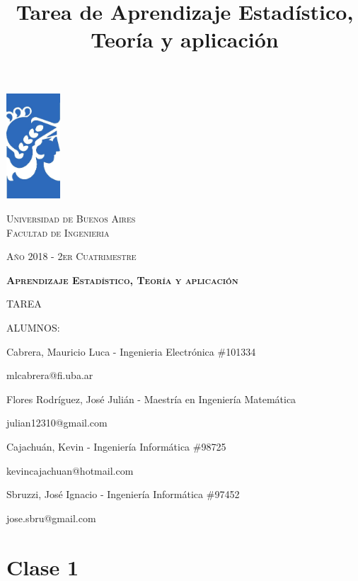 \documentclass[12pt, a4paper]{article}
\title{Tarea de Aprendizaje Estadístico, Teoría y aplicación}
\author{}
\date{}
\begin{document}
\begin{titlepage} %
	\centering
	  \includegraphics[width=0.15\textwidth]{FIUBA_logo}\par
	  {\scshape\Large Universidad de Buenos Aires
      \\ Facultad de Ingenieria \par}
      {\scshape\small Año 2018 - 2er Cuatrimestre \par}
	  \vspace{1cm}
	  {\scshape\bfseries\LARGE Aprendizaje Estadístico, Teoría y aplicación\par}
	  \vspace{0.5cm}
	  \vspace{1cm}
      {\scshape\large TAREA \par}
      \vspace{0.5cm
      \raggedright}
      {\scshape\large  ALUMNOS: \par}
      \vspace{0.5cm}
    \centering
      {\normalsize  Cabrera, Mauricio Luca - Ingenieria Electrónica \#101334 \par}
      {\small  mlcabrera@fi.uba.ar \par}
	  \vspace{0.15cm}
	  {\normalsize Flores Rodríguez, José Julián - Maestría en Ingeniería Matemática \par}
      {\small  julian12310@gmail.com \par}
	  \vspace{0.15cm}
	  {\normalsize Cajachuán, Kevin - Ingeniería Informática \#98725 \par}
      {\small  kevincajachuan@hotmail.com \par}
	  \vspace{0.15cm}
	  {\normalsize Sbruzzi, José Ignacio - Ingeniería Informática \#97452 \par}
      {\small  jose.sbru@gmail.com \par}
\end{titlepage} %
\newpage
\tableofcontents
\newpage
\section{Clase 1}
\end{document}
